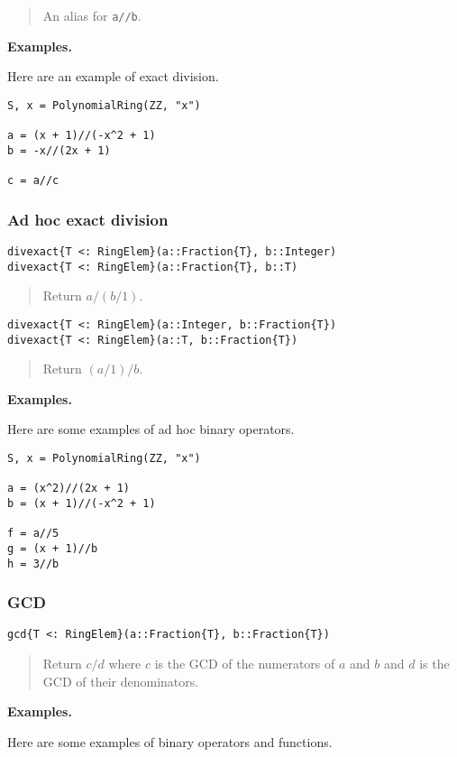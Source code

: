 \documentclass[a4paper,10pt]{article}
\newcommand{\code}{\lstinline}
\newcommand{\desc}[1]{\vspace{-3mm}\begin{quote}#1\end{quote}}
\begin{document}
\desc{An alias for \code{a//b}.}

\textbf{Examples.}

Here are an example of exact division.

\begin{lstlisting}
S, x = PolynomialRing(ZZ, "x")

a = (x + 1)//(-x^2 + 1) 
b = -x//(2x + 1)

c = a//c
\end{lstlisting}

\subsubsection{Ad hoc exact division}

\begin{lstlisting}
divexact{T <: RingElem}(a::Fraction{T}, b::Integer)
divexact{T <: RingElem}(a::Fraction{T}, b::T)
\end{lstlisting}

\desc{Return $a / (b/1)$.}

\begin{lstlisting}
divexact{T <: RingElem}(a::Integer, b::Fraction{T})
divexact{T <: RingElem}(a::T, b::Fraction{T})
\end{lstlisting}

\desc{Return $(a/1) / b$.}

\textbf{Examples.}

Here are some examples of ad hoc binary operators.

\begin{lstlisting}
S, x = PolynomialRing(ZZ, "x")

a = (x^2)//(2x + 1)
b = (x + 1)//(-x^2 + 1)

f = a//5
g = (x + 1)//b
h = 3//b
\end{lstlisting}

\subsubsection{GCD}

\begin{lstlisting}
gcd{T <: RingElem}(a::Fraction{T}, b::Fraction{T})
\end{lstlisting}

\desc{Return $c/d$ where $c$ is the GCD of the numerators of $a$ and $b$ and
$d$ is the GCD of their denominators.}

\textbf{Examples.}

Here are some examples of binary operators and functions.
\end{document}
